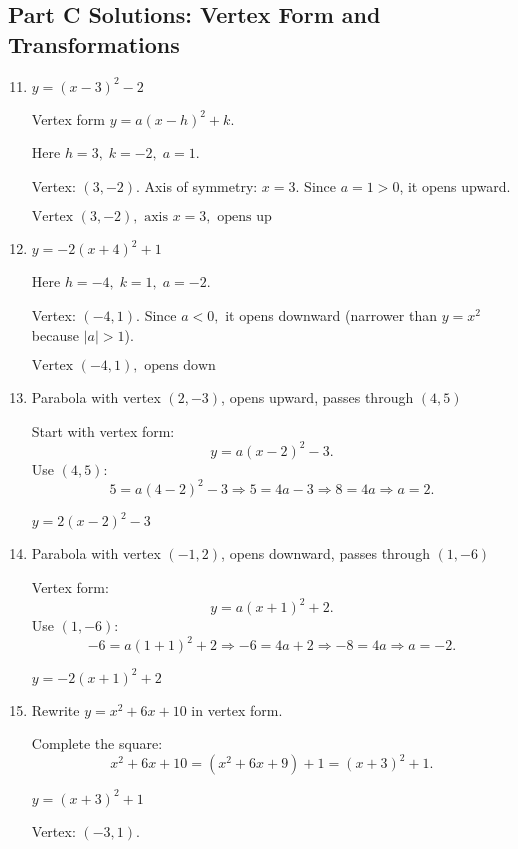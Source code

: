 \documentclass[12pt]{article}
\begin{document}
\subsection*{Part C Solutions: Vertex Form and Transformations}
\begin{enumerate}
  \setcounter{enumi}{10}
  \item \(y = (x - 3)^2 - 2\)

  Vertex form \(y = a(x - h)^2 + k.\)

  Here \(h = 3,\; k = -2,\; a = 1.\)

  Vertex: \((3, -2)\).  
  Axis of symmetry: \(x = 3.\)  
  Since \(a = 1 > 0\), it opens upward.

  \(\boxed{\text{Vertex } (3, -2), \text{ axis } x = 3, \text{ opens up}}\)

  \item \(y = -2(x + 4)^2 + 1\)

  Here \(h = -4,\; k = 1,\; a = -2.\)

  Vertex: \((-4, 1).\)  
  Since \(a < 0,\) it opens downward (narrower than \(y = x^2\) because \(|a| > 1\)).

  \(\boxed{\text{Vertex } (-4, 1), \text{ opens down}}\)

  \item Parabola with vertex \((2, -3)\), opens upward, passes through \((4, 5)\)

  Start with vertex form:
  \[
  y = a(x - 2)^2 - 3.
  \]
  Use \((4, 5)\):
  \[
  5 = a(4 - 2)^2 - 3 \Rightarrow 5 = 4a - 3 \Rightarrow 8 = 4a \Rightarrow a = 2.
  \]

  \(\boxed{y = 2(x - 2)^2 - 3}\)

  \item Parabola with vertex \((-1, 2)\), opens downward, passes through \((1, -6)\)

  Vertex form:
  \[
  y = a(x + 1)^2 + 2.
  \]
  Use \((1, -6)\):
  \[
  -6 = a(1 + 1)^2 + 2 \Rightarrow -6 = 4a + 2 \Rightarrow -8 = 4a \Rightarrow a = -2.
  \]

  \(\boxed{y = -2(x + 1)^2 + 2}\)

  \item Rewrite \(y = x^2 + 6x + 10\) in vertex form.

  Complete the square:
  \[
  x^2 + 6x + 10 = (x^2 + 6x + 9) + 1 = (x + 3)^2 + 1.
  \]

  \(\boxed{y = (x + 3)^2 + 1}\)

  Vertex: \((-3, 1)\).
\end{enumerate}
\end{document}
